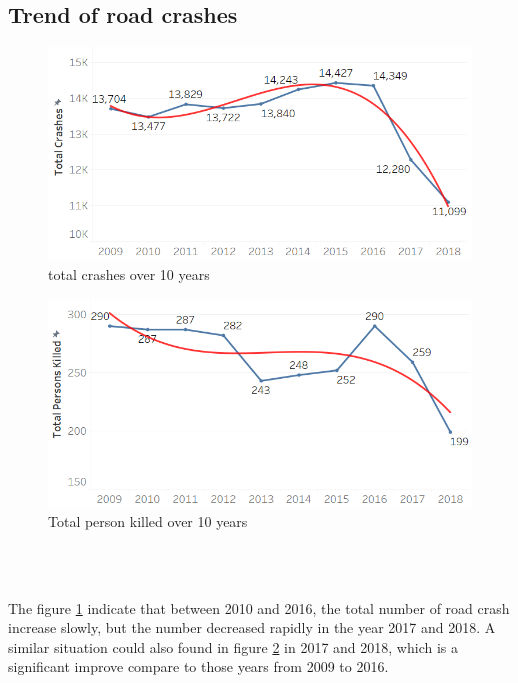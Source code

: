 \documentclass[10pt]{article}
\theoremstyle{definition}
\begin{document}
\subsection{Trend of road crashes}
\begin{minipage}{\linewidth}
  	\centering
  	\begin{minipage}{0.48\linewidth}
     \begin{figure}[H]
              \includegraphics[width=\linewidth]{images/totalCrashOverYears.png}
              \caption{total crashes over 10 years}
              \label{fig:TrendYears}
    \end{figure}
  \end{minipage}
  \hspace{0.01\linewidth}
  \begin{minipage}{0.48\linewidth}
        \begin{figure}[H]
     	\includegraphics[width=\linewidth]{images/totalKilledOverYears.png}
        \caption{Total person killed over 10 years}
        \label{fig:TrendKillYears}
        \end{figure}
    \end{minipage}\\
    \vspace{12pt}
\end{minipage}\\
The figure \ref{fig:TrendYears} indicate that between 2010 and 2016, the total number of road crash increase slowly, but the number decreased rapidly in the year 2017 and 2018. A similar situation could also found in figure \ref{fig:TrendKillYears} in 2017 and 2018, which is a significant improve compare to those years from 2009 to 2016. \par
\end{document}
